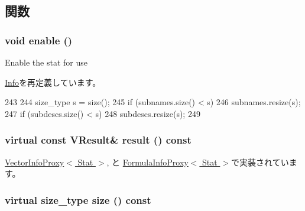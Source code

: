 \subsection{関数}
\hypertarget{classStats_1_1VectorInfo_a486f22824bd83c5308a0d70ffac6f758}{
\subsubsection[{enable}]{\setlength{\rightskip}{0pt plus 5cm}void enable ()}}
\label{classStats_1_1VectorInfo_a486f22824bd83c5308a0d70ffac6f758}
Enable the stat for use 

\hyperlink{classStats_1_1Info_a486f22824bd83c5308a0d70ffac6f758}{Info}を再定義しています。


\begin{DoxyCode}
243 {
244     size_type s = size();
245     if (subnames.size() < s)
246         subnames.resize(s);
247     if (subdescs.size() < s)
248         subdescs.resize(s);
249 }
\end{DoxyCode}
\hypertarget{classStats_1_1VectorInfo_a7fcf57115122663db42f39cc18ca0f62}{
\subsubsection[{result}]{\setlength{\rightskip}{0pt plus 5cm}virtual const {\bf VResult}\& result () const}}
\label{classStats_1_1VectorInfo_a7fcf57115122663db42f39cc18ca0f62}


\hyperlink{classStats_1_1VectorInfoProxy_aba312f9e3431b1652f8b3ddf3fe105dc}{VectorInfoProxy$<$ Stat $>$}, と \hyperlink{classStats_1_1FormulaInfoProxy_aba312f9e3431b1652f8b3ddf3fe105dc}{FormulaInfoProxy$<$ Stat $>$}で実装されています。\hypertarget{classStats_1_1VectorInfo_a4051d143efd31726fa13df03ae4e1bce}{
\subsubsection[{size}]{\setlength{\rightskip}{0pt plus 5cm}virtual {\bf size\_\-type} size () const}}
\label{classStats_1_1VectorInfo_a4051d143efd31726fa13df03ae4e1bce}


